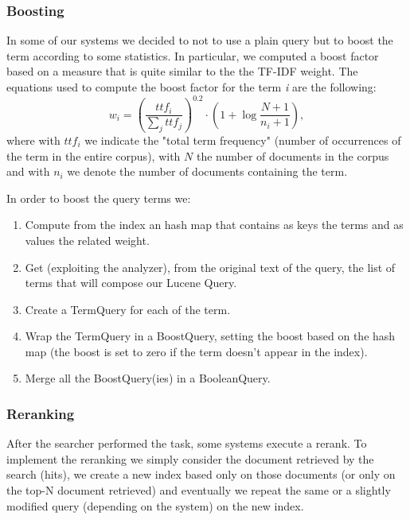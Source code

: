 \subsubsection{Boosting}
\label{subsub:boost}
In some of our systems we decided to not to use a plain query but to boost the term according to some statistics. In particular, we computed a boost factor based on a measure that is quite similar to the the TF-IDF weight. The equations used to compute the boost factor for the term \textit{i} are the following:
\begin{equation}
 w_i={\left(\frac{ttf_i}{\sum_{j} ttf_j}\right)}^{0.2} \cdot \left(1+\log \frac{N+1}{n_i+1} \right),
\end{equation}
where with $ttf_i$ we indicate the "total term frequency" (number of occurrences of the term in the entire corpus), with $N$ the number of documents in the corpus and with $n_i$ we denote the number of documents containing the term.

\par
In order to boost the query terms we:
\begin{enumerate}
    \item Compute from the index an hash map that contains as keys the terms and as values the related weight.
    \item Get (exploiting the analyzer), from the original text of the query, the list of terms that will compose our Lucene Query.
    \item Create a TermQuery for each of the term.
    \item Wrap the TermQuery in a BoostQuery, setting the boost based on the hash map (the boost is set to zero if the term doesn't appear in the index).
    \item Merge all the BoostQuery(ies) in a BooleanQuery.
\end{enumerate}



\subsubsection{Reranking}
\label{subsub:rerank}
After the searcher performed the task, some systems execute a rerank. To implement the reranking we simply consider the document retrieved by the search (hits), we create a new index based only on those documents (or only on the top-N document retrieved) and eventually we repeat the same or a slightly modified query (depending on the system) on the new index.


